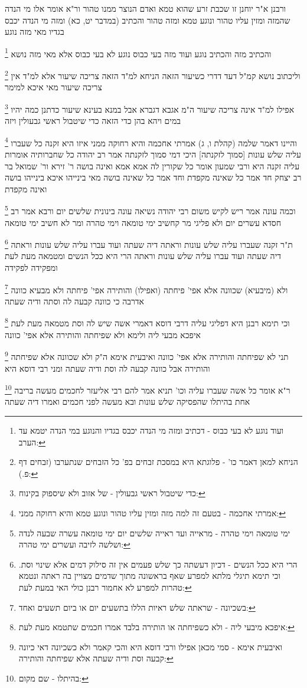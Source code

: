 \documentclass[12pt, openany]{book}
\newcommand{\footnotecomment}[1]{
	\renewcommand\thefootnote{}
	\footnote{#1}}
\newcommand{\commenta}[1]{\footnotecomment{#1}}
\begin{document}
{{ורבנן א"ר יוחנן זו שכבת זרע שהוא טמא ואדם הנוצר ממנו טהור 
ור"א אומר אלו מי הנדה שהמזה ומזין עליו טהור ונוגע טמא ומזה טהור והכתיב (במדבר יט, כא) ומזה מי הנדה יכבס בגדיו מאי מזה נוגע 
\commenta{ועוד נוגע לא בעי כבוס - דכתיב ומזה מי הנדה יכבס בגדיו והנוגע במי הנדה יטמא עד הערב:}
והכתיב מזה והכתיב נוגע ועוד מזה בעי כבוס נוגע לא בעי כבוס אלא מאי מזה נושא 
\commenta{הניחא למאן דאמר כו' - פלוגתא היא במסכת זבחים בפ' כל הזבחים שנתערבו (זבחים דף פ.):}
וליכתוב נושא קמ"ל דעד דדרי כשיעור הזאה הניחא למ"ד הזאה צריכה שיעור אלא למ"ד אין צריכה שיעור מאי איכא למימר 
\commenta{כדי שיטבול ראשי גבעולין - של אזוב ולא שיספוק בקינוח:}
אפילו למ"ד אינה צריכה שיעור ה"מ אגבא דגברא אבל במנא בעינא שיעור כדתנן כמה יהיו במים ויהא בהן כדי הזאה כדי שיטבול ראשי גבעולין ויזה 
\commenta{אמרתי אחכמה - בטעם זה למה מזה ומזין עליו טהור ונוגע טמא והיא רחוקה ממני:}
והיינו דאמר שלמה (קהלת ו, ג) אמרתי אחכמה והיא רחוקה ממני
איזו היא זקנה כל שעברו עליה שלש עונות [סמוך לזקנתה] היכי דמי סמוך לזקנתה אמר רב יהודה כל שחברותיה אומרות עליה זקנה היא ורבי שמעון אומר
כל שקורין לה אמא אמא ואינה בושה ר' זירא ור' שמואל בר רב יצחק חד אמר כל שאינה מקפדת וחד אמר כל שאינה בושה  מאי בינייהו איכא בינייהו בושה ואינה מקפדת 
\commenta{ימי טומאה וימי טהרה - מראייה ועד ראייה שלשים יום ימי טומאה עשרה שבעה לנדה ושלשה לזיבה ועשרים ימי טהרה:}
וכמה עונה אמר ריש לקיש משום רבי יהודה נשיאה עונה בינונית שלשים יום ורבא אמר רב חסדא עשרים יום ולא פליגי מר קחשיב ימי טומאה וימי טהרה ומר לא חשיב ימי טומאה 
\commenta{הרי היא ככל הנשים - דכיון דעשתה כך שלש פעמים אין זה סילוק דמים אלא שינוי וסת. וכי תימא תיגלי מלתא למפרע שאף בראשונה מתוך שדמים מצויין בה ראתה ונטמא טהרות למפרע לא אחמור רבנן כולי האי במעת לעת:}
ת"ר זקנה שעברו עליה שלש עונות וראתה דיה שעתה ועוד עברו עליה שלש עונות וראתה דיה שעתה ועוד עברו עליה שלש עונות וראתה הרי היא ככל הנשים ומטמאה מעת לעת ומפקידה לפקידה 
\commenta{בשכיונה - שראתה שלש ראיות הללו בתשעים יום או ביום תשעים ואחד:}
ולא (מיבעיא) שכוונה אלא אפי' פיחתה (ואפילו) והותירה 
אפי' פיחתה ולא מבעיא כוונה אדרבה כי כוונה קבעה לה וסתה ודיה שעתה 
\commenta{איפכא מיבעי ליה - ולא כשפיחתה או הותירה בלבד אמרו חכמים שתטמא מעת לעת:}
וכי תימא רבנן היא דפליגי עליה דרבי דוסא דאמרי אשה שיש לה וסת מטמאה מעת לעת איפכא מבעי ליה ולימא ולא שפיחתה והותירה אלא אפי' כוונה 
\commenta{ואיבעית אימא - סמי מכאן אפילו ורבי דוסא היא והכי קאמר ולא כשכיונה דאי כיונה קבעה וסת ודיה שעתה אלא שפיחתה והותירה:}
תני לא שפיחתה והותירה אלא אפי' כוונה ואיבעית אימא ה"ק ולא שכוונה אלא שפיחתה והותירה אבל כוונה קבעה לה וסת ודיה שעתה ומני רבי דוסא היא
\commenta{בהיתלו - שם מקום:}
ר"א אומר כל אשה שעברו עליה וכו' תניא אמר להם רבי אליעזר לחכמים מעשה בריבה אחת בהיתלו שהפסיקה שלש עונות ובא מעשה לפני חכמים ואמרו דיה שעתה 
}}
\end{document}
